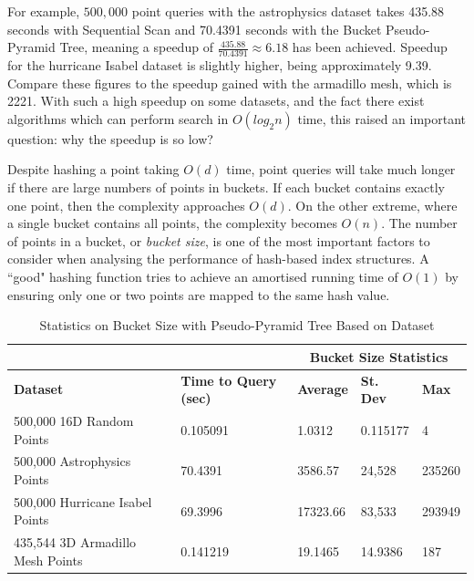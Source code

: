 For example, $500,000$ point queries with the astrophysics dataset takes 435.88 seconds with Sequential Scan and 70.4391 seconds with the Bucket Pseudo-Pyramid Tree, meaning a speedup of $\frac{435.88}{70.4391} \approx 6.18$ has been achieved. Speedup for the hurricane Isabel dataset is slightly higher, being approximately 9.39. Compare these figures to the speedup gained with the armadillo mesh, which is 2221. With such a high speedup on some datasets, and the fact there exist algorithms which can perform search in $O(log_2 n)$ time, this raised an important question: why the speedup is so low?

Despite hashing a point taking $O(d)$ time, point queries will take much longer if there are large numbers of points in buckets. If each bucket contains exactly one point, then the complexity approaches $O(d)$. On the other extreme, where a single bucket contains all points, the complexity becomes $O(n)$. The number of points in a bucket, or \textit{bucket size}, is one of the most important factors to consider when analysing the performance of hash-based index structures. A ``good" hashing function tries to achieve an amortised running time of $O(1)$ by ensuring only one or two points are mapped to the same hash value.

\begin{table}
	\centering
	\begin{tabular}{|l|l|l|l|l|}
		\hline
		& & \multicolumn{3}{c|}{\textbf{Bucket Size Statistics}} \\
		\hline
		\textbf{Dataset} & \textbf{Time to Query (sec)} & \textbf{Average} & \textbf{St. Dev} & \textbf{Max} \\
		\hline
		500,000 16D Random Points & 0.105091 & 1.0312 & 0.115177 & 4 \\
		500,000 Astrophysics Points & 70.4391 & 3586.57 & 24,528 & 235260 \\
		500,000 Hurricane Isabel Points & 69.3996 & 17323.66 & 83,533 & 293949 \\
		435,544 3D Armadillo Mesh Points & 0.141219 & 19.1465 & 14.9386 & 187 \\
		\hline
	\end{tabular}
	\caption{Statistics on Bucket Size with Pseudo-Pyramid Tree Based on Dataset}
	\label{tab:perf1-bucket-stats}
\end{table}

